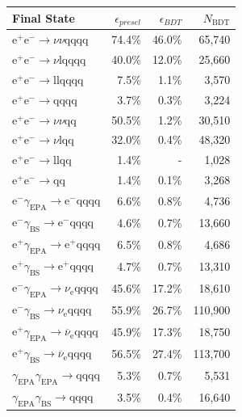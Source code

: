 \begin{table}[h!]
\centering
\begin{tabular}{ l r r r }
\hline
Final State & $\epsilon_{presel}$ & $\epsilon_{BDT}$ & $N_{\text{BDT}}$ \\ 
\hline
$\text{e}^{+}\text{e}^{-} \rightarrow \nu{\nu}\text{qqqq}$ & 74.4\% & 46.0\% & 65,740 \\
$\text{e}^{+}\text{e}^{-} \rightarrow \nu\text{lqqqq}$ & 40.0\% & 12.0\% & 25,660 \\
$\text{e}^{+}\text{e}^{-} \rightarrow \text{llqqqq}$ & 7.5\% & 1.1\% & 3,570 \\
$\text{e}^{+}\text{e}^{-} \rightarrow \text{qqqq}$ & 3.7\% & 0.3\% & 3,224 \\
$\text{e}^{+}\text{e}^{-} \rightarrow \nu{\nu}\text{qq}$ & 50.5\% & 1.2\% & 30,510 \\
$\text{e}^{+}\text{e}^{-} \rightarrow \nu\text{lqq}$ & 32.0\% & 0.4\% & 48,320 \\
$\text{e}^{+}\text{e}^{-} \rightarrow \text{llqq}$ & 1.4\% & - & 1,028 \\
$\text{e}^{+}\text{e}^{-} \rightarrow \text{qq}$ & 1.4\% & 0.1\% & 3,268 \\
$\text{e}^{-}\gamma_{\text{EPA}} \rightarrow \text{e}^{-}\text{qqqq}$ & 6.6\% & 0.8\% & 4,736 \\
$\text{e}^{-}\gamma_{\text{BS}} \rightarrow \text{e}^{-}\text{qqqq}$ & 4.6\% & 0.7\% & 13,660 \\
$\text{e}^{+}\gamma_{\text{EPA}} \rightarrow \text{e}^{+}\text{qqqq}$ & 6.5\% & 0.8\% & 4,686 \\
$\text{e}^{+}\gamma_{\text{BS}} \rightarrow \text{e}^{+}\text{qqqq}$ & 4.7\% & 0.7\% & 13,310 \\
$\text{e}^{-}\gamma_{\text{EPA}} \rightarrow \nu_{\text{e}}\text{qqqq}$ & 45.6\% & 17.2\% & 18,610 \\
$\text{e}^{-}\gamma_{\text{BS}} \rightarrow \nu_{\text{e}}\text{qqqq}$ & 55.9\% & 26.7\% & 110,900 \\
$\text{e}^{+}\gamma_{\text{EPA}} \rightarrow \overline{\nu}_{\text{e}}\text{qqqq}$ & 45.9\% & 17.3\% & 18,750 \\
$\text{e}^{+}\gamma_{\text{BS}} \rightarrow \overline{\nu}_{\text{e}}\text{qqqq}$ & 56.5\% & 27.4\% & 113,700 \\
$\gamma_{\text{EPA}}\gamma_{\text{EPA}} \rightarrow \text{qqqq}$ & 5.3\% & 0.7\% & 5,531 \\
$\gamma_{\text{EPA}}\gamma_{\text{BS}} \rightarrow \text{qqqq}$ & 3.5\% & 0.4\% & 16,640 \\

\end{tabular}
\end{table}
